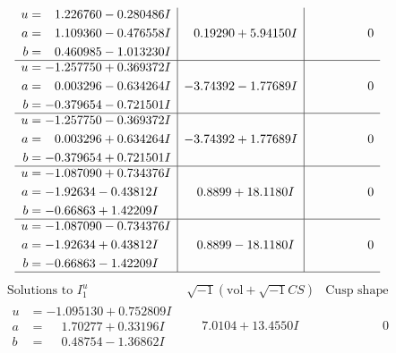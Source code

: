 \documentclass[1p]{elsarticle_modified}
\theoremstyle{definition}
\newcommand{\I}{\sqrt{-1}}
\begin{document}
$$\begin{array}{c|c|c}
\begin{aligned}
u &= \phantom{-}1.226760 - 0.280486 I \\
a &= \phantom{-}1.109360 - 0.476558 I \\
b &= \phantom{-}0.460985 - 1.013230 I\end{aligned}
 & \phantom{-}0.19290 + 5.94150 I & \phantom{-0.000000 } 0 \\ \hline\begin{aligned}
u &= -1.257750 + 0.369372 I \\
a &= \phantom{-}0.003296 - 0.634264 I \\
b &= -0.379654 - 0.721501 I\end{aligned}
 & -3.74392 - 1.77689 I & \phantom{-0.000000 } 0 \\ \hline\begin{aligned}
u &= -1.257750 - 0.369372 I \\
a &= \phantom{-}0.003296 + 0.634264 I \\
b &= -0.379654 + 0.721501 I\end{aligned}
 & -3.74392 + 1.77689 I & \phantom{-0.000000 } 0 \\ \hline\begin{aligned}
u &= -1.087090 + 0.734376 I \\
a &= -1.92634 - 0.43812 I \\
b &= -0.66863 + 1.42209 I\end{aligned}
 & \phantom{-}0.8899 + 18.1180 I & \phantom{-0.000000 } 0 \\ \hline\begin{aligned}
u &= -1.087090 - 0.734376 I \\
a &= -1.92634 + 0.43812 I \\
b &= -0.66863 - 1.42209 I\end{aligned}
 & \phantom{-}0.8899 - 18.1180 I & \phantom{-0.000000 } 0\\
 \hline 
 \end{array}$$\newpage$$\begin{array}{c|c|c}  
\text{Solutions to }I^u_{1}& \I (\text{vol} + \sqrt{-1}CS) & \text{Cusp shape}\\
 \hline 
\begin{aligned}
u &= -1.095130 + 0.752809 I \\
a &= \phantom{-}1.70277 + 0.33196 I \\
b &= \phantom{-}0.48754 - 1.36862 I\end{aligned}
 & \phantom{-}7.0104 + 13.4550 I & \phantom{-0.000000 } 0 \\ \hline\begin{aligned}

\end{aligned}
\end{array}$$
\end{document}
